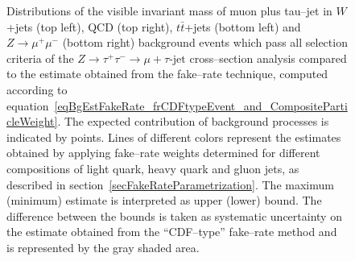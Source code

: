 \begin{figure}[t]
\begin{center}
\begin{picture}
\end{picture}
\caption{\captiontext Distributions of the visible invariant mass of muon plus tau--jet in
         $W$+jets (top left), QCD (top right), $t\bar{t}$+jets (bottom left) 
         and $Z \rightarrow \mu^{+} \mu^{-}$ (bottom right) background events which pass all selection criteria 
         of the $Z \rightarrow \tau^{+} \tau^{-} \rightarrow \mu + \tau\mbox{-jet}$ cross--section analysis
	 compared to the estimate obtained from the fake--rate technique, 
         computed according to equation~\ref{eqBgEstFakeRate_frCDFtypeEvent_and_CompositeParticleWeight}.
	 The expected contribution of background processes is indicated by points.
	 Lines of different colors represent the estimates obtained by applying 
         fake--rate weights determined for different compositions of light quark, heavy quark and gluon jets,
         as described in section~\ref{secFakeRateParametrization}.
	 The maximum (minimum) estimate is interpreted as upper (lower) bound.
	 The difference between the bounds is taken as systematic uncertainty on the estimate 
         obtained from the ``CDF--type'' fake--rate method and is represented by the gray shaded area.}
\label{figBgEstFakeRate_frCDFtypeResults_mVisible}
\end{center}
\end{figure} 

